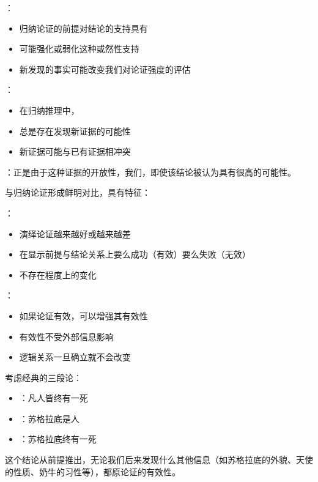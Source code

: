 \begin{theorembox}[title=归纳论证的开放性特征]
：
\begin{itemize}
  \item 归纳论证的前提对结论的支持具有
  \item {}可能强化或弱化这种或然性支持
  \item 新发现的事实可能改变我们对论证强度的评估
\end{itemize}

：
\begin{itemize}
  \item 在归纳推理中，
  \item 总是存在发现新证据的可能性
  \item 新证据可能与已有证据相冲突
\end{itemize}

：正是由于这种证据的开放性，我们，即使该结论被认为具有很高的可能性。
\end{theorembox}

\begin{theorembox}[title=演绎论证的封闭性特征]
与归纳论证形成鲜明对比，具有特征：

：
\begin{itemize}
  \item 演绎论证越来越好或越来越差
  \item 在显示前提与结论关系上要么成功（有效）要么失败（无效）
  \item 不存在程度上的变化
\end{itemize}

：
\begin{itemize}
  \item 如果论证有效，可以增强其有效性
  \item 有效性不受外部信息影响
  \item 逻辑关系一旦确立就不会改变
\end{itemize}
\end{theorembox}

\begin{examplebox}[title=演绎论证的稳定性示例]
考虑经典的三段论：
\begin{itemize}
  \item {}：凡人皆终有一死
  \item {}：苏格拉底是人
  \item {}：苏格拉底终有一死
\end{itemize}

这个结论从前提推出，无论我们后来发现什么其他信息（如苏格拉底的外貌、天使的性质、奶牛的习性等），都原论证的有效性。
\end{examplebox}

